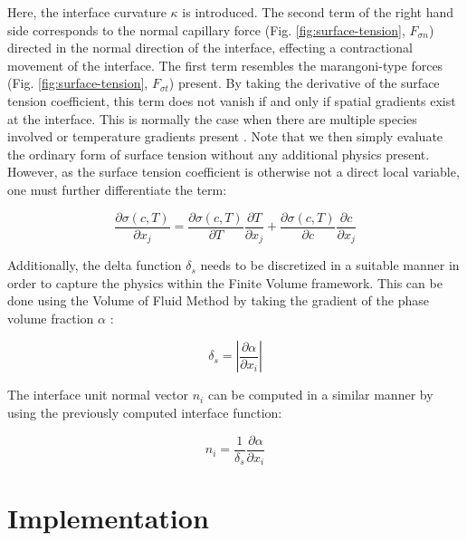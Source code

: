 \documentclass[conference,final,a4paper]{IEEEtran}
\begin{document}
Here, the interface curvature $\kappa$ is introduced. The second term of the right hand side corresponds to the normal capillary force (Fig. \ref{fig:surface-tension}, $F_{\sigma n}$) directed in the normal direction of the interface, effecting a contractional movement of the interface. The first term resembles the marangoni-type forces (Fig. \ref{fig:surface-tension}, $F_{\sigma t}$) present. By taking the derivative of the surface tension coefficient, this term does not vanish if and only if spatial gradients exist at the interface. This is normally the case when there are multiple species involved or temperature gradients present \cite{j.straubThermokapillareGrenzflachenkonvektionGasblasen1990}. Note that we then simply evaluate the ordinary form of surface tension without any additional physics present. However, as the surface tension coefficient is otherwise not a direct local variable, one must further differentiate the term:

\begin{equation}
    \frac{\partial \sigma(c,T)}{\partial x_j} = \frac{\partial \sigma(c,T)}{\partial T} \frac{\partial T}{\partial x_j} + \frac{\partial \sigma(c,T)}{\partial c} \frac{\partial c}{\partial x_j}
    \label{eq:sigmadiff}
\end{equation}

Additionally, the delta function $\delta_s$ needs to be discretized in a suitable manner in order to capture the physics within the Finite Volume framework. This can be done using the Volume of Fluid Method by taking the gradient of the phase volume fraction $\alpha$ \cite{gueyffierVolumeofFluidInterfaceTracking1999,hirtVolumeFluidVOF1981}:

\begin{equation}
    \delta_s = \left\lvert \frac{\partial \alpha}{\partial x_i} \right\rvert
\end{equation}

The interface unit normal vector $n_i$ can be computed in a similar manner by using the previously computed interface function:

\begin{equation}
    n_i = \frac{1}{\delta_s} \frac{\partial \alpha}{\partial x_i}
\end{equation}


\section{Implementation}
\end{document}
